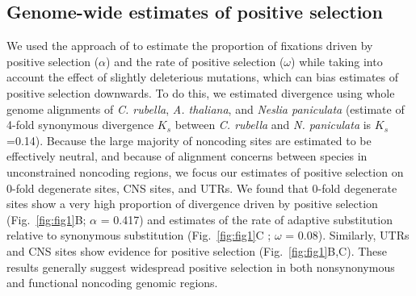 \subsection{Genome-wide estimates of positive selection} 
We used the approach of \citet{eyre2009} to estimate the proportion of fixations driven by positive selection ($\alpha$) and the rate of positive selection ($\omega$) while taking into account the effect of slightly deleterious mutations, which can bias estimates of positive selection downwards. To do this, we estimated divergence using whole genome alignments of \textit{C. rubella}, \textit{A. thaliana}, and \textit{Neslia paniculata} (estimate of 4-fold synonymous divergence $K_{s}$ between \textit{C. rubella} and \textit{N. paniculata} is $K_{s}$=0.14). Because the large majority of noncoding sites are estimated to be effectively neutral, and because of alignment concerns between species in unconstrained noncoding regions, we focus our estimates of positive selection on 0-fold degenerate sites, CNS sites, and UTRs. We found that 0-fold degenerate sites show a very high proportion of divergence driven by positive selection  (Fig.~\ref{fig:fig1}B; $\alpha$ = 0.417) and estimates of the rate of adaptive substitution relative to synonymous substitution (Fig.~\ref{fig:fig1}C ; $\omega$ = 0.08). Similarly, UTRs and CNS sites show evidence for positive selection (Fig.~\ref{fig:fig1}B,C). These results generally suggest widespread positive selection in both nonsynonymous and functional noncoding genomic regions.

